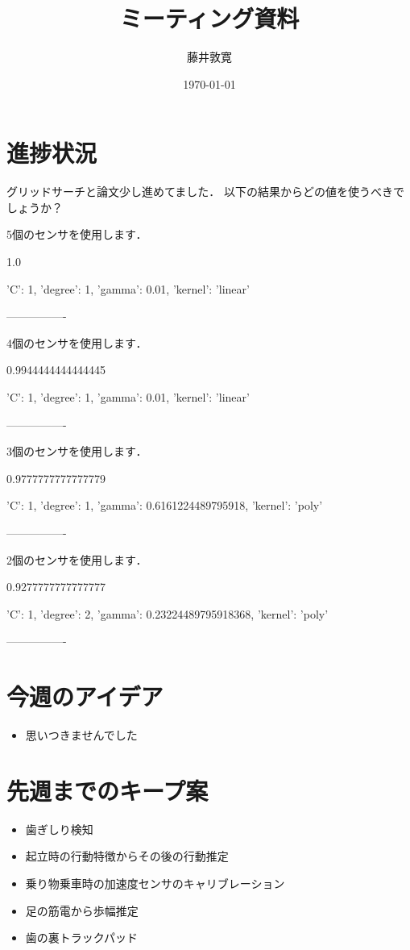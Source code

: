 \documentclass[a4j,twocolumn,10pt]{jarticle}
\title{ミーティング資料}
\author{藤井敦寛}
\date{\today}
\begin{document}
\maketitle

\section{進捗状況}
グリッドサーチと論文少し進めてました．
以下の結果からどの値を使うべきでしょうか？


5個のセンサを使用します．

1.0

{'C': 1, 'degree': 1, 'gamma': 0.01, 'kernel': 'linear'}

----------------


4個のセンサを使用します．

0.9944444444444445

{'C': 1, 'degree': 1, 'gamma': 0.01, 'kernel': 'linear'}

----------------


3個のセンサを使用します．

0.9777777777777779

{'C': 1, 'degree': 1, 'gamma': 0.6161224489795918, 'kernel': 'poly'}

----------------


2個のセンサを使用します．

0.9277777777777777

{'C': 1, 'degree': 2, 'gamma': 0.23224489795918368, 'kernel': 'poly'}

----------------

\section{今週のアイデア}
\begin{itemize}
  \item 思いつきませんでした
\end{itemize}

\section{先週までのキープ案}
\begin{itemize}
  \item 歯ぎしり検知
  \item 起立時の行動特徴からその後の行動推定
  \item 乗り物乗車時の加速度センサのキャリブレーション
  \item 足の筋電から歩幅推定
  \item 歯の裏トラックパッド
\end{itemize}
\end{document}
